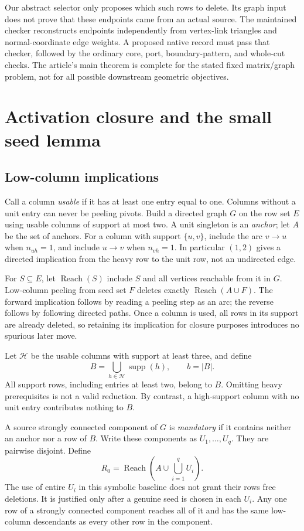 \documentclass[11pt,letterpaper]{article}
\theoremstyle{definition}
\newcommand{\Reach}{\operatorname{Reach}}
\newcommand{\supp}{\operatorname{supp}}
\begin{document}
Our abstract selector only proposes which such rows to delete. Its graph
input does not prove that these endpoints came from an actual source. The
maintained checker reconstructs endpoints independently from vertex-link
triangles and normal-coordinate edge weights. A proposed native record must
pass that checker, followed by the ordinary core, port, boundary-pattern,
and whole-cut checks. The article's main theorem is complete for the stated
fixed matrix/graph problem, not for all possible downstream geometric
objectives.

\section{Activation closure and the small seed lemma}\label{sec:activation}
\subsection{Low-column implications}
Call a column \emph{usable} if it has at least one entry equal to one.
Columns without a unit entry can never be peeling pivots. Build a directed
graph $G$ on the row set $E$ using usable columns of support at most two.
A unit singleton is an \emph{anchor}; let $A$ be the set of anchors. For a
column with support $\{u,v\}$, include the arc $v\to u$ when $n_{uh}=1$,
and include $u\to v$ when $n_{vh}=1$. In particular $(1,2)$ gives a directed
implication from the heavy row to the unit row, not an undirected edge.

For $S\subseteq E$, let $\Reach(S)$ include $S$ and all vertices reachable
from it in $G$. Low-column peeling from seed set $F$ deletes exactly
$\Reach(A\cup F)$. The forward implication follows by reading a peeling
step as an arc; the reverse follows by following directed paths. Once a
column is used, all rows in its support are already deleted, so retaining
its implication for closure purposes introduces no spurious later move.

Let $\mathcal H$ be the usable columns with support at least three, and define
\begin{equation}\label{eq:B}
 B=\bigcup_{h\in\mathcal H}\supp(h),\qquad b=|B|.
\end{equation}
All support rows, including entries at least two, belong to $B$. Omitting
heavy prerequisites is not a valid reduction. By contrast, a high-support
column with no unit entry contributes nothing to $B$.

A source strongly connected component of $G$ is \emph{mandatory} if it
contains neither an anchor nor a row of $B$. Write these components as
$U_1,\ldots,U_q$. They are pairwise disjoint. Define
\begin{equation}\label{eq:R0}
 R_0=\Reach\left(A\cup\bigcup_{i=1}^{q}U_i\right).
\end{equation}
The use of entire $U_i$ in this symbolic baseline does not grant their rows
free deletions. It is justified only after a genuine seed is chosen in each
$U_i$. Any one row of a strongly connected component reaches all of it and
has the same low-column descendants as every other row in the component.
\end{document}
